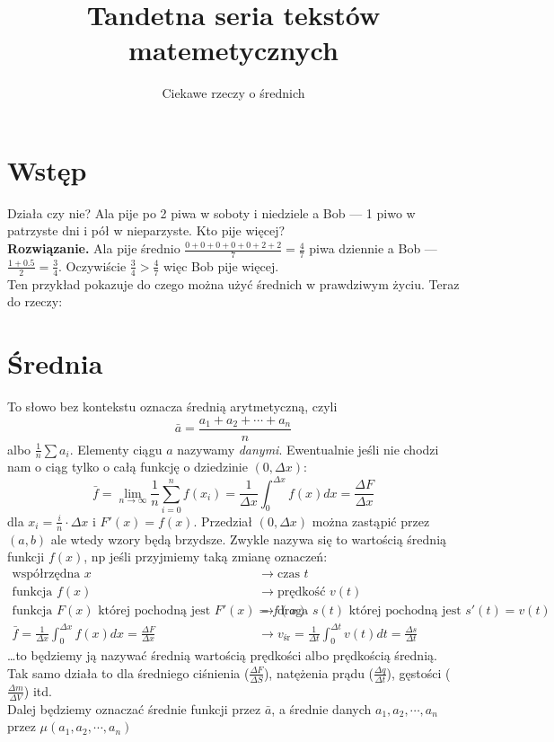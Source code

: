 \documentclass{article}
\title{Tandetna seria tekstów matemetycznych}
\author{Ciekawe rzeczy o średnich}
\begin{document}
\maketitle
\section{Wstęp}
Działa czy nie? Ala pije po 2 piwa w soboty i niedziele a Bob --- 1 piwo w patrzyste dni i pół w nieparzyste. Kto pije więcej?\\
\textbf{Rozwiązanie.} Ala pije średnio $\frac{0+0+0+0+0+2+2}7=\frac47$ piwa dziennie a Bob --- $\frac{1+0.5}2=\frac34$. Oczywiście $\frac34>\frac47$ więc Bob pije więcej.\\
Ten przykład pokazuje do czego można użyć średnich w prawdziwym życiu. Teraz do rzeczy:
\section{Średnia}
To słowo bez kontekstu oznacza średnią arytmetyczną, czyli\[\bar a = \frac{a_1+a_2+\cdots+a_n}n\]albo $\frac1n\sum a_i$. Elementy ciągu $a$ nazywamy \textit{danymi}.
Ewentualnie jeśli nie chodzi nam o ciąg tylko o całą funkcję o dziedzinie $(0, \Delta x)$:
\[\bar f = \lim_{n\to\infty}\frac1n\sum_{i=0}^{n} f(x_i) = \frac1{\Delta x}\int_0^{\Delta x}f(x)dx = \frac{\Delta F}{\Delta x}\]
dla $x_i=\frac in\cdot\Delta x$ i $F'(x)=f(x)$.
Przedział $(0, \Delta x)$ można zastąpić przez $(a, b)$ ale wtedy wzory będą brzydsze. 
Zwykle nazywa się to wartością średnią funkcji $f(x)$, np jeśli przyjmiemy taką zmianę oznaczeń:
\begin{align*}
	\text{współrzędna } x &\to \text{czas }t\\
	\text{funkcja }f(x) &\to \text{prędkość }v(t)\\
	\text{funkcja }F(x)\text{ której pochodną jest }F'(x)=f(x) &\to \text{droga }s(t)\text{ której pochodną jest }s'(t)=v(t)\\
	\bar f = \frac1{\Delta x}\int_0^{\Delta x}f(x)dx = \frac{\Delta F}{\Delta x} &\to v_\text{śr} = \frac1{\Delta t}\int_0^{\Delta t}v(t)dt = \frac{\Delta s}{\Delta t}
\end{align*}
…to będziemy ją nazywać średnią wartością prędkości albo prędkością średnią.
Tak samo działa to dla średniego ciśnienia ($\frac{\Delta F}{\Delta S}$), natężenia prądu ($\frac{\Delta q}{\Delta t}$), gęstości ($\frac{\Delta m}{\Delta V}$) itd.\\
Dalej będziemy oznaczać średnie funkcji przez $\bar a$, a średnie danych $a_1, a_2, \cdots, a_n$ przez $\mu(a_1, a_2, \cdots, a_n)$
\end{document}
